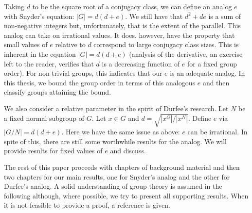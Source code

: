 \documentclass[main.tex]{subfiles}
\begin{document}
Taking $d$ to be the square root of a conjugacy class, we can define an analog $e$ with Snyder's equation: $|G| = d(d+e)$. We still have that  $d^2 + de$ is a sum of non-negative integers but, unfortunately, that is the extent of the parallel. This analog can take on irrational values. It does, however, have the property that small values of $e$ relative to $d$ correspond to large conjugacy class sizes. This is inherent in the equation $|G| = d(d + e)$ (analysis of the derivative, an exercise left to the reader, verifies that $d$ is a decreasing function of $e$ for a fixed group order). For non-trivial groups, this indicates that our $e$ is an adequate analog. In this thesis, we bound the group order in terms of this analogous $e$ and then classify groups attaining the bound.

We also consider a relative parameter in the spirit of Durfee's research. Let $N$ be a fixed normal subgroup of $G$. Let $x \in G$ and $d = \sqrt{|x^G|/|x^N|}$. Define $e$ via $|G/N| = d(d+e)$. Here we have the same issue as above: $e$ can be irrational. In spite of this, there are still some worthwhile results for the analog. We will provide results for fixed values of $e$ and discuss.

The rest of this paper proceeds with chapters of background material and then two chapters for our main results, one for Snyder's analog and the other for Durfee's analog. A solid understanding of group theory is assumed in the following although, where possible, we try to present all supporting results. When it is not feasible to provide a proof, a reference is given.
\end{document}
